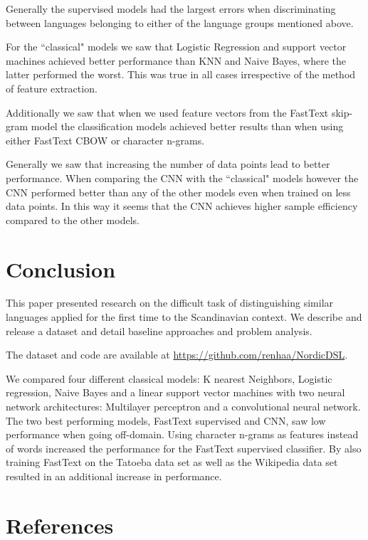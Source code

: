\documentclass[11pt,a4paper]{article}
\begin{document}
Generally the supervised models had the largest errors when discriminating between languages belonging to either of the language groups mentioned above.

For the ``classical" models we saw that Logistic Regression and support vector machines achieved better performance than KNN and Naive Bayes, where the latter performed the worst. This was true in all cases irrespective of the method of feature extraction.

Additionally we saw that when we used feature vectors from the FastText skip-gram model the classification models achieved better results than when using either FastText CBOW or character n-grams.

Generally we saw that increasing the number of data points lead to better performance. When comparing the CNN with the ``classical" models however the CNN performed better than any of the other models even when trained on less data points. In this way it seems that the CNN achieves higher sample efficiency compared to the other models.
 \section{Conclusion}
This paper presented research on the difficult task of distinguishing similar languages applied for the first time to the Scandinavian context. We describe and release a dataset and detail baseline approaches and problem analysis. 

The dataset and code are available at \url{https://github.com/renhaa/NordicDSL}.

We compared four different classical models: K nearest Neighbors, Logistic regression, Naive Bayes and a linear support vector machines with two neural network architectures: Multilayer perceptron and a convolutional neural network. The two best performing models, FastText supervised and CNN, saw low performance when going off-domain. Using character n-grams as features instead of words increased the performance for the FastText supervised classifier. By also training FastText on the Tatoeba data set as well as the Wikipedia data set resulted in an additional increase in performance.



 


\section{References}
\label{main:ref}



\end{document}
